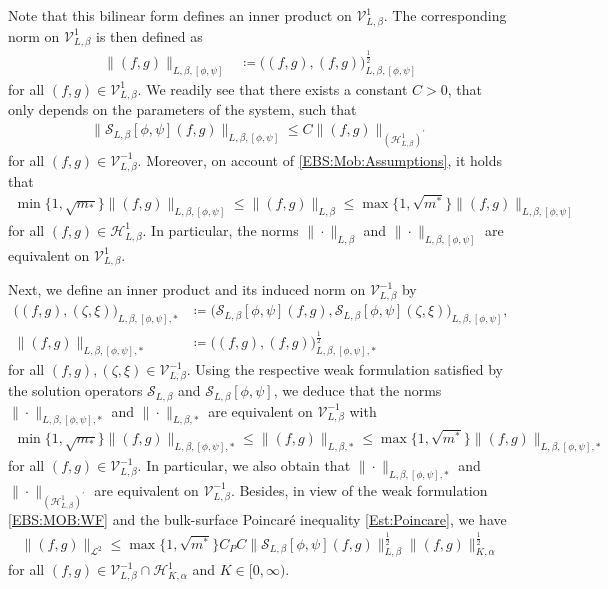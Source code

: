 \documentclass[10pt,reqno]{amsart}
\theoremstyle{remark}
\numberwithin{equation}{section}
\newcommand{\norm}[1]{\| #1 \|}
\begin{document}
Note that this bilinear form defines an inner product on $\mathcal{V}^1_{L,\beta}$. The corresponding norm on $\mathcal{V}^1_{L,\beta}$ is then defined as
\begin{align*}
    \norm{(f,g)}_{L,\beta,[\phi,\psi]} &\coloneqq \big((f,g),(f,g)\big)_{L,\beta,[\phi,\psi]}^{\frac12}
\end{align*}
for all $(f,g)\in\mathcal{V}^1_{L,\beta}$. We readily see that there exists a constant $C > 0$, that only depends on the parameters of the system, such that
\begin{align}\label{BSE:MOB:Est:Apriori}
    \norm{\mathcal{S}_{L,\beta}[\phi,\psi](f,g)}_{L,\beta,[\phi,\psi]} \leq C\norm{(f,g)}_{(\mathcal{H}^1_{L,\beta})^\prime}
\end{align}
for all $(f,g)\in\mathcal{V}^{-1}_{L,\beta}$. Moreover, on account of \eqref{EBS:Mob:Assumptions}, it holds that
\begin{align}\label{NormEquivalence:1}
    \min\{1,\sqrt{m_\ast}\}\norm{(f,g)}_{L,\beta,[\phi,\psi]} \leq \norm{(f,g)}_{L,\beta} \leq \max\{1,\sqrt{m^\ast}\}\norm{(f,g)}_{L,\beta,[\phi,\psi]}
\end{align}
for all $(f,g)\in\mathcal{H}^1_{L,\beta}$. In particular, the norms $\norm{\cdot}_{L,\beta}$ and $\norm{\cdot}_{L,\beta,[\phi,\psi]}$ are equivalent on $\mathcal{V}^1_{L,\beta}$.

Next, we define an inner product and its induced norm on $\mathcal{V}^{-1}_{L,\beta}$ by
\begin{align*}
    \big((f,g),(\zeta,\xi)\big)_{L,\beta,[\phi,\psi],\ast} &\coloneqq \big(\mathcal{S}_{L,\beta}[\phi,\psi](f,g),\mathcal{S}_{L,\beta}[\phi,\psi](\zeta,\xi)\big)_{L,\beta,[\phi,\psi]}, \\
    \norm{(f,g)}_{L,\beta,[\phi,\psi],\ast} &\coloneqq \big((f,g),(f,g)\big)_{L,\beta,[\phi,\psi],\ast}^{\frac12}
\end{align*}
for all $(f,g), (\zeta,\xi)\in\mathcal{V}^{-1}_{L,\beta}$. Using the respective weak formulation satisfied by the solution operators $\mathcal{S}_{L,\beta}$ and $\mathcal{S}_{L,\beta}[\phi,\psi]$, we deduce that the norms $\norm{\cdot}_{L,\beta,[\phi,\psi],\ast}$ and $\norm{\cdot}_{L,\beta,\ast}$ are equivalent on $\mathcal{V}^{-1}_{L,\beta}$ with
\begin{align}\label{NormEquivalence:EBS}
    \min\{1,\sqrt{m_\ast}\}\norm{(f,g)}_{L,\beta,[\phi,\psi],\ast} \leq \norm{(f,g)}_{L,\beta,\ast} \leq \max\{1,\sqrt{m^\ast}\}\norm{(f,g)}_{L,\beta,[\phi,\psi],\ast}
\end{align}
for all $(f,g)\in\mathcal{V}^{-1}_{L,\beta}$. In particular, we also obtain that $\norm{\cdot}_{L,\beta,[\phi,\psi],\ast}$ and $\norm{\cdot}_{(\mathcal{H}^1_{L,\beta})^\prime}$ are equivalent on $\mathcal{V}^{-1}_{L,\beta}$. Besides, in view of the weak formulation \eqref{EBS:MOB:WF} and the bulk-surface Poincar\'{e} inequality \eqref{Est:Poincare}, we have
\begin{align}\label{Est:fg:L^2:K}
    \norm{(f,g)}_{\mathcal{L}^2} \leq \max\{1,\sqrt{m^\ast}\}C_PC\norm{\mathcal{S}_{L,\beta}[\phi,\psi](f,g)}_{L,\beta}^{\frac12}\norm{(f,g)}_{K,\alpha}^{\frac12}
\end{align}
for all $(f,g)\in\mathcal{V}_{L,\beta}^{-1}\cap\mathcal{H}^1_{K,\alpha}$ and $K\in[0,\infty)$.
\end{document}
